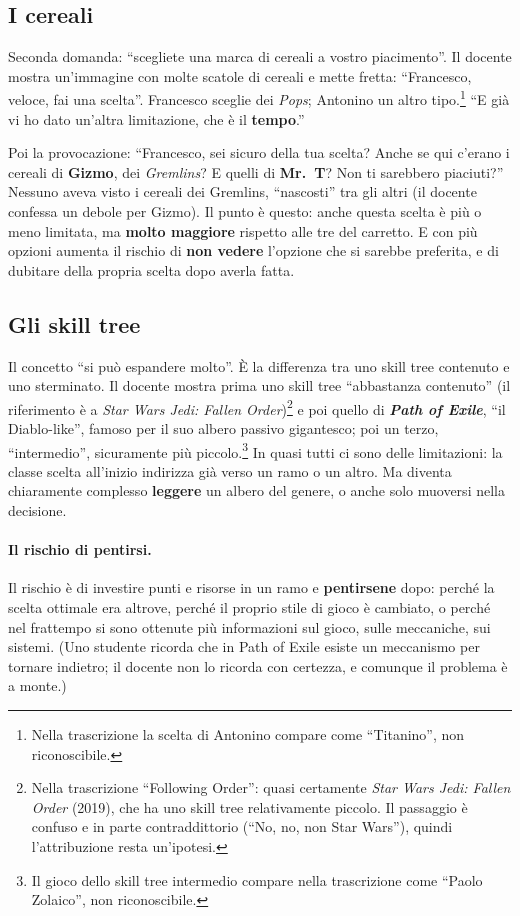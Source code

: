 \subsection{I cereali}

Seconda domanda: ``scegliete una marca di cereali a vostro piacimento''. Il
docente mostra un'immagine con molte scatole di cereali e mette fretta:
``Francesco, veloce, fai una scelta''. Francesco sceglie dei \emph{Pops};
Antonino un altro tipo.\footnote{Nella trascrizione la scelta di Antonino
compare come ``Titanino'', non riconoscibile.} ``E già vi ho dato un'altra
limitazione, che è il \textbf{tempo}.''

Poi la provocazione: ``Francesco, sei sicuro della tua scelta? Anche se qui
c'erano i cereali di \textbf{Gizmo}, dei \emph{Gremlins}? E quelli di
\textbf{Mr.~T}? Non ti sarebbero piaciuti?'' Nessuno aveva visto i cereali
dei Gremlins, ``nascosti'' tra gli altri (il docente confessa un debole per
Gizmo). Il punto è questo: anche questa scelta è più o meno limitata, ma
\textbf{molto maggiore} rispetto alle tre del carretto. E con più opzioni
aumenta il rischio di \textbf{non vedere} l'opzione che si sarebbe preferita,
e di dubitare della propria scelta dopo averla fatta.

\subsection{Gli skill tree}

Il concetto ``si può espandere molto''. È la differenza tra uno skill tree
contenuto e uno sterminato. Il docente mostra prima uno skill tree
``abbastanza contenuto'' (il riferimento è a \emph{Star Wars Jedi: Fallen
Order})\footnote{Nella trascrizione ``Following Order'': quasi certamente
\emph{Star Wars Jedi: Fallen Order} (2019), che ha uno skill tree
relativamente piccolo. Il passaggio è confuso e in parte contraddittorio
(``No, no, non Star Wars''), quindi l'attribuzione resta un'ipotesi.} e poi
quello di \textbf{\emph{Path of Exile}}, ``il Diablo-like'', famoso per il suo
albero passivo gigantesco; poi un terzo, ``intermedio'', sicuramente più
piccolo.\footnote{Il gioco dello skill tree intermedio compare nella
trascrizione come ``Paolo Zolaico'', non riconoscibile.} In quasi tutti ci
sono delle limitazioni: la classe scelta all'inizio indirizza già verso un
ramo o un altro. Ma diventa chiaramente complesso \textbf{leggere} un albero
del genere, o anche solo muoversi nella decisione.

\paragraph{Il rischio di pentirsi.} Il rischio è di investire punti e
risorse in un ramo e \textbf{pentirsene} dopo: perché la scelta ottimale era
altrove, perché il proprio stile di gioco è cambiato, o perché nel frattempo
si sono ottenute più informazioni sul gioco, sulle meccaniche, sui sistemi.
(Uno studente ricorda che in Path of Exile esiste un meccanismo per tornare
indietro; il docente non lo ricorda con certezza, e comunque il problema è a
monte.)

